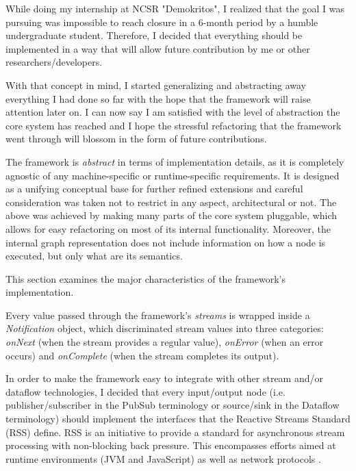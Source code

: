 \documentclass{dithesis}
\begin{document}


While doing my internship at NCSR "Demokritos", I realized that the goal I was pursuing was impossible to reach closure in a 6-month period by a humble undergraduate student. Therefore, I decided that everything should be implemented in a way that will allow future contribution by me or other researchers/developers. 

With that concept in mind, I started generalizing and abstracting away everything I had done so far with the hope that the framework will raise attention later on. I can now say I am satisfied with the level of abstraction the core system has reached and I hope the stressful refactoring that the framework went through will blossom in the form of future contributions.


The framework is \textit{abstract} in terms of implementation details, as it is completely agnostic of any machine-specific or runtime-specific requirements. It is designed as a unifying conceptual base for further refined extensions and careful consideration was taken not to restrict in any aspect, architectural or not. The above was achieved by making many parts of the core system pluggable, which allows for easy refactoring on most of its internal functionality. Moreover, the internal graph representation does not include information on how a node is executed, but only what are its semantics.

This section examines the major characteristics of the framework's implementation.

Every value passed through the framework's \textit{streams} is wrapped inside a \textit{Notification} object, which discriminated stream values into three categories: \textit{onNext} (when the stream provides a regular value), \textit{onError} (when an error occurs) and \textit{onComplete} (when the stream completes its output).

In order to make the framework easy to integrate with other stream and/or dataflow technologies, I decided that every input/output node (i.e. publisher/subscriber in the PubSub terminology or source/sink in the Dataflow terminology) should implement the interfaces that the Reactive Streams Standard (RSS) define. RSS is an initiative to provide a standard for asynchronous stream processing with non-blocking back pressure. This encompasses efforts aimed at runtime environments (JVM and JavaScript) as well as network protocols \cite{rss}.
\end{document}
